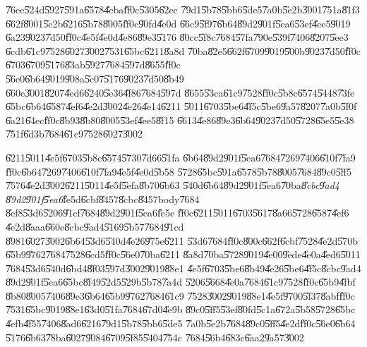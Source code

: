 \documentclass[12pt,a4paper]{article}
\begin{document}
\bigskip

\U{76ee}\U{524d}\U{5927}\U{591a}\U{6578}\U{4eba}\U{ff0c}\U{5305}\U{62ec}%
\U{79d1}\U{5b78}\U{5bb6}\U{5de5}\U{7a0b}\U{5e2b}\U{3001}\U{751a}\U{81f3}%
\U{662f}\U{8001}\U{5e2b}\U{6216}\U{5b78}\U{8005}\U{ff0c}\U{90fd}\U{4e0d}%
\U{66c9}\U{5f97}\U{6b64}\U{89d2}\U{901f}\U{5ea6}\U{53ef}\U{4ee5}\U{9019}%
\U{6a23}\U{9023}\U{7d50}\U{ff0c}\U{4e5f}\U{4e0d}\U{4e86}\U{89e3}\U{5176}%
\U{80cc}\U{5f8c}\U{7684}\U{57fa}\U{790e}\U{539f}\U{7406}\U{8207}\U{5ee3}%
\U{6cdb}\U{61c9}\U{7528}\U{6027}\U{3002}\U{7531}\U{65bc}\U{6211}\U{8a8d}%
\U{70ba}\U{82e5}\U{662f}\U{6709}\U{9019}\U{500b}\U{9023}\U{7d50}\U{ff0c}%
\U{6703}\U{6709}\U{5176}\U{83ab}\U{5927}\U{7684}\U{597d}\U{8655}\U{ff0c}%
\U{56e0}\U{6b64}\U{9019}\U{908a}\U{5c07}\U{5176}\U{9023}\U{7d50}\U{8b49}%
\U{660e}\U{3001}\U{8207}\U{4ed6}\U{6240}\U{5e36}\U{4f86}\U{7684}\U{597d}%
\U{8655}\U{53ca}\U{61c9}\U{7528}\U{ff0c}\U{5b8c}\U{6574}\U{5448}\U{73fe}%
\U{65bc}\U{6b64}\U{6587}\U{4ef6}\U{4e2d}\U{3002}\U{4e26}\U{4e14}\U{6211}%
\U{5011}\U{6703}\U{5be6}\U{4f5c}\U{5be6}\U{9a57}\U{8207}\U{7a0b}\U{5f0f}%
\U{6a21}\U{64ec}\U{ff0c}\U{8b93}\U{8b80}\U{8005}\U{53ef}\U{4ee5}\U{8f15}%
\U{6613}\U{4e86}\U{89e3}\U{6b64}\U{9023}\U{7d50}\U{5728}\U{65e5}\U{5e38}%
\U{751f}\U{6d3b}\U{7684}\U{61c9}\U{7528}\U{6027}\U{3002}

\bigskip

\U{6211}\U{5011}\U{4e5f}\U{6703}\U{5b8c}\U{6574}\U{5730}\U{7d66}\U{51fa}%
\U{6b64}\U{89d2}\U{901f}\U{5ea6}\U{7684}\U{7269}\U{7406}\U{610f}\U{7fa9}%
\U{ff0c}\U{6b64}\U{7269}\U{7406}\U{610f}\U{7fa9}\U{4e5f}\U{4e0d}\U{5b58}%
\U{5728}\U{65bc}\U{591a}\U{6578}\U{5b78}\U{8005}\U{7684}\U{89c0}\U{5ff5}%
\U{7576}\U{4e2d}\U{3002}\U{6211}\U{5011}\U{4e5f}\U{5efa}\U{8b70}\U{6b63}%
\U{540d}\U{6b64}\U{89d2}\U{901f}\U{5ea6}\U{70ba}\emph{\U{8cbc}\U{9ad4}%
\U{89d2}\U{901f}\U{5ea6}}\U{fe5d}\U{6cbf}\U{8457}\U{8cbc}\U{8457}body\U{7684}%
\U{8ef8}\U{53d6}\U{5206}\U{91cf}\U{7684}\U{89d2}\U{901f}\U{5ea6}\U{fe5e}%
\U{ff0c}\U{6211}\U{5011}\U{6703}\U{5617}\U{8a66}\U{5728}\U{6587}\U{4ef6}%
\U{4e2d}\U{8aaa}\U{660e}\U{8cbc}\U{9ad4}\U{5169}\U{5b57}\U{7684}\U{91cd}%
\U{8981}\U{6027}\U{3002}\U{6b64}\U{53d6}\U{540d}\U{4e26}\U{975e}\U{6211}%
\U{53d6}\U{7684}\U{ff0c}\U{800c}\U{662f}\U{6cbf}\U{7528}\U{4e2d}\U{570b}%
\U{65b9}\U{9762}\U{7684}\U{7528}\U{6cd5}\U{ff0c}\U{56e0}\U{70ba}\U{6211}%
\U{8a8d}\U{70ba}\U{5728}\U{9019}\U{4e00}\U{9ede}\U{4e0a}\U{4ed6}\U{5011}%
\U{7684}\U{53d6}\U{540d}\U{6bd4}\U{8f03}\U{597d}\U{3002}\U{9019}\U{88e1}%
\U{4e5f}\U{6703}\U{5be6}\U{8b49}\U{4e26}\U{5be6}\U{4f5c}\U{8cbc}\U{9ad4}%
\U{89d2}\U{901f}\U{5ea6}\U{65bc}\U{8f49}\U{52d5}\U{529b}\U{5b78}\U{7a4d}%
\U{5206}\U{5668}\U{4e0a}\U{7684}\U{61c9}\U{7528}\U{ff0c}\U{65b9}\U{4fbf}%
\U{8b80}\U{8005}\U{7406}\U{89e3}\U{6b64}\U{65b9}\U{9762}\U{7684}\U{61c9}%
\U{7528}\U{3002}\U{9019}\U{88e1}\U{4e5f}\U{9700}\U{5f37}\U{8abf}\U{ff0c}%
\U{7531}\U{65bc}\U{9019}\U{88e1}\U{63d0}\U{51fa}\U{7684}\U{67d0}\U{4e9b}%
\U{89c0}\U{5ff5}\U{53ef}\U{80fd}\U{5c1a}\U{672a}\U{5b58}\U{5728}\U{65bc}%
\U{4efb}\U{4f55}\U{7406}\U{8ad6}\U{6216}\U{79d1}\U{5b78}\U{5bb6}\U{5de5}%
\U{7a0b}\U{5e2b}\U{7684}\U{89c0}\U{5ff5}\U{4e2d}\U{ff0c}\U{56e0}\U{6b64}%
\U{5176}\U{6b63}\U{78ba}\U{6027}\U{9084}\U{6709}\U{5f85}\U{5404}\U{754c}%
\U{7684}\U{56b4}\U{683c}\U{6aa2}\U{9a57}\U{3002}
\end{document}
